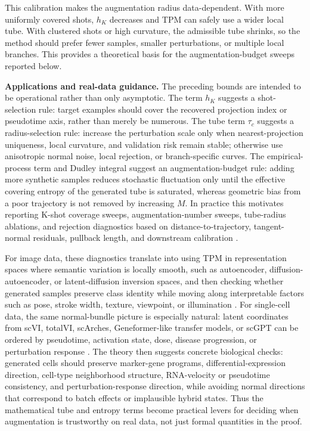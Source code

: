 \documentclass{article}
\begin{document}
This calibration makes the augmentation radius data-dependent. With more uniformly covered shots, $h_K$ decreases and TPM can safely use a wider local tube. With clustered shots or high curvature, the admissible tube shrinks, so the method should prefer fewer samples, smaller perturbations, or multiple local branches. This provides a theoretical basis for the augmentation-budget sweeps reported below.

\smallskip
\noindent\textbf{Applications and real-data guidance.}
The preceding bounds are intended to be operational rather than only asymptotic. The term $h_K$ suggests a shot-selection rule: target examples should cover the recovered projection index or pseudotime axis, rather than merely be numerous. The tube term $\tau_c$ suggests a radius-selection rule: increase the perturbation scale only when nearest-projection uniqueness, local curvature, and validation risk remain stable; otherwise use anisotropic normal noise, local rejection, or branch-specific curves. The empirical-process term and Dudley integral suggest an augmentation-budget rule: adding more synthetic samples reduces stochastic fluctuation only until the effective covering entropy of the generated tube is saturated, whereas geometric bias from a poor trajectory is not removed by increasing $M$. In practice this motivates reporting K-shot coverage sweeps, augmentation-number sweeps, tube-radius ablations, and rejection diagnostics based on distance-to-trajectory, tangent-normal residuals, pullback length, and downstream calibration \citep{dudley1967sizes, vandervaart1996weak, wainwright2019high, niyogi2008finding, genovese2012manifold, aamari2019nonasymptotic}.

For image data, these diagnostics translate into using TPM in representation spaces where semantic variation is locally smooth, such as autoencoder, diffusion-autoencoder, or latent-diffusion inversion spaces, and then checking whether generated samples preserve class identity while moving along interpretable factors such as pose, stroke width, texture, viewpoint, or illumination \citep{hauberg2015principal, arvanitidis2018latent, shao2018riemannian, preechakul2022diffusion, rombach2022high}. For single-cell data, the same normal-bundle picture is especially natural: latent coordinates from scVI, totalVI, scArches, Geneformer-like transfer models, or scGPT can be ordered by pseudotime, activation state, dose, disease progression, or perturbation response \citep{lopez2018deep, gayoso2021joint, lotfollahi2022mapping, theodoris2023transfer, cui2024scgpt, trapnell2014dynamics, wolf2019paga, moon2019phate, bergen2020generalizing}. The theory then suggests concrete biological checks: generated cells should preserve marker-gene programs, differential-expression direction, cell-type neighborhood structure, RNA-velocity or pseudotime consistency, and perturbation-response direction, while avoiding normal directions that correspond to batch effects or implausible hybrid states. Thus the mathematical tube and entropy terms become practical levers for deciding when augmentation is trustworthy on real data, not just formal quantities in the proof.
\end{document}
